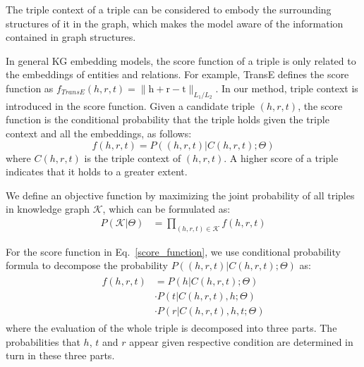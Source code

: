 The triple context of a triple can be considered to embody the surrounding structures of it in the graph, which makes the model aware of the information contained in graph structures.

In general KG embedding models, the score function of a triple is only related to the embeddings of entities and relations. For example, TransE defines the score function as $f_{TransE}(h,r,t)=\|\bm{\mathrm{h}} + \bm{\mathrm{r}} -\bm{\mathrm{t}}\|_{L_1/L_2}$. In our method, triple context is introduced in the score function. Given a candidate triple $(h,r,t)$, the score function is the conditional probability that the triple holds given the triple context and all the embeddings, as follows:
\begin{equation}\label{score_function}
  f(h,r,t) = P((h,r,t)|C(h,r,t);\Theta)
\end{equation}
where $C(h,r,t)$ is the triple context of $(h,r,t)$. A higher score of a triple indicates that it holds to a greater extent.

We define an objective function by maximizing the joint probability of all triples in knowledge graph $\mathcal{K}$, which can be formulated as:
\begin{align} \label{joint_prob}
  P(\mathcal{K}|\Theta) &= \prod_{(h,r,t)\in \mathcal{K}} f(h,r,t)
\end{align}

For the score function in Eq.~\eqref{score_function}, we use conditional probability formula to decompose the probability $P((h,r,t)|C(h,r,t);\Theta)$ as:
\begin{align} \label{decomposition}
  \begin{split}
    f(h,r,t) &= P(h|C(h,r,t);\Theta) \\
    & \cdot P(t|C(h,r,t),h;\Theta) \\
    & \cdot P(r|C(h,r,t),h,t;\Theta)
  \end{split}
\end{align}
where the evaluation of the whole triple is decomposed into three parts. The probabilities that $h$, $t$ and $r$ appear given respective condition are determined in turn in these three parts.

